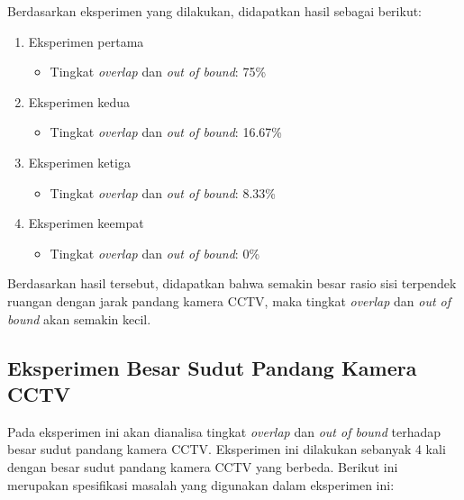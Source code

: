 Berdasarkan eksperimen yang dilakukan, didapatkan hasil sebagai berikut:
\begin{enumerate}
	\item Eksperimen pertama
	\begin{itemize}
		\item Tingkat \textit{overlap} dan \textit{out of bound}: 75\%
	\end{itemize}
		
	\item Eksperimen kedua
	\begin{itemize}
		\item Tingkat \textit{overlap} dan \textit{out of bound}: 16.67\%
	\end{itemize}
	
	\item Eksperimen ketiga
	\begin{itemize}
		\item Tingkat \textit{overlap} dan \textit{out of bound}: 8.33\%
	\end{itemize}
	\item Eksperimen keempat
	\begin{itemize}
		\item Tingkat \textit{overlap} dan \textit{out of bound}: 0\%
	\end{itemize}
\end{enumerate}
Berdasarkan hasil tersebut, didapatkan bahwa semakin besar rasio sisi terpendek ruangan dengan jarak pandang kamera CCTV, maka tingkat \textit{overlap} dan \textit{out of bound} akan semakin kecil.

\subsection{Eksperimen Besar Sudut Pandang Kamera CCTV}
Pada eksperimen ini akan dianalisa tingkat \textit{overlap} dan \textit{out of bound} terhadap besar sudut pandang kamera CCTV. Eksperimen ini dilakukan sebanyak 4 kali dengan besar sudut pandang kamera CCTV yang berbeda. Berikut ini merupakan spesifikasi masalah yang digunakan dalam eksperimen ini:

